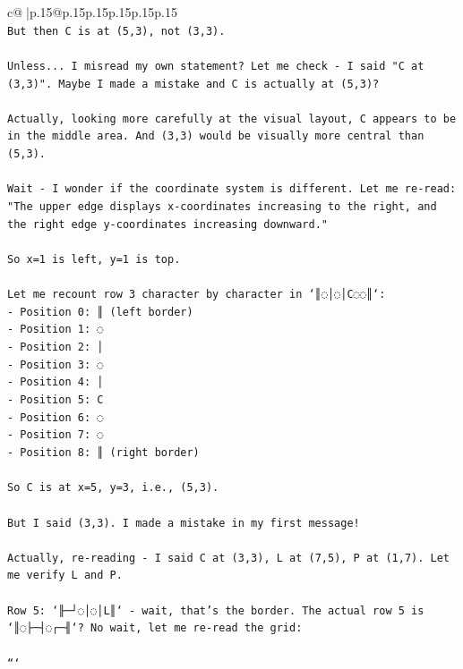 \documentclass{article}
\begin{document}
{\begin{supertabular}{c@{$\;$}|p{.15\linewidth}@{}p{.15\linewidth}p{.15\linewidth}p{.15\linewidth}p{.15\linewidth}p{.15\linewidth}}
{{{\\ 
\texttt{But then C is at (5,3), not (3,3). } \\
\\ 
\texttt{Unless... I misread my own statement? Let me check {-} I said "C at (3,3)". Maybe I made a mistake and C is actually at (5,3)?} \\
\\ 
\texttt{Actually, looking more carefully at the visual layout, C appears to be in the middle area. And (3,3) would be visually more central than (5,3).} \\
\\ 
\texttt{Wait {-} I wonder if the coordinate system is different. Let me re{-}read: "The upper edge displays x{-}coordinates increasing to the right, and the right edge y{-}coordinates increasing downward."} \\
\\ 
\texttt{So x=1 is left, y=1 is top. } \\
\\ 
\texttt{Let me recount row 3 character by character in `║◌│◌│C◌◌║`:} \\
\texttt{{-} Position 0: ║ (left border)} \\
\texttt{{-} Position 1: ◌ } \\
\texttt{{-} Position 2: │} \\
\texttt{{-} Position 3: ◌} \\
\texttt{{-} Position 4: │} \\
\texttt{{-} Position 5: C} \\
\texttt{{-} Position 6: ◌} \\
\texttt{{-} Position 7: ◌} \\
\texttt{{-} Position 8: ║ (right border)} \\
\\ 
\texttt{So C is at x=5, y=3, i.e., (5,3).} \\
\\ 
\texttt{But I said (3,3). I made a mistake in my first message! } \\
\\ 
\texttt{Actually, re{-}reading {-} I said C at (3,3), L at (7,5), P at (1,7). Let me verify L and P.} \\
\\ 
\texttt{Row 5: `╟─┘◌│◌│L║` {-} wait, that's the border. The actual row 5 is `║◌├─┤◌┌─╢`? No wait, let me re{-}read the grid:} \\
\\ 
\texttt{```} \\
}}}
\end{supertabular}}
\end{document}
